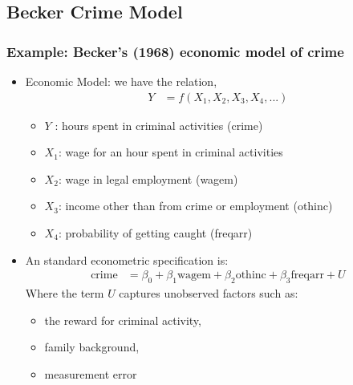 

\subsection{Becker Crime Model}


\begin{frame}
  \frametitle{Example: Becker's (1968) economic model of crime}
  \begin{itemize}
  \item Economic Model: we have the relation,
     \begin{align*}
      Y &= f(X_1, X_2, X_3, X_4, ...)
       \end{align*}
    \begin{itemize}
    \item $Y$ : hours spent in criminal activities (crime)
    \item $X_1$: wage for an hour spent in criminal activities
    \item $X_2$:  wage in legal employment (wagem)
    \item $X_3$: income other than from crime or employment (othinc)
    \item $X_4$: probability of getting caught (freqarr)
    \end{itemize}
  \item An standard  econometric specification is:
     \begin{align*} 
     \mathrm{crime} &= \beta_0 + \beta_1 \mathrm{wagem} + \beta_2
    \mathrm{othinc} + \beta_3 \mathrm{freqarr} + U
    \end{align*}
    Where the term $U$ captures unobserved factors such as:
    \begin{itemize}
    \item the reward for criminal activity, 
    \item  family background, 
    \item measurement error
    \end{itemize}
  \end{itemize}
\end{frame}

